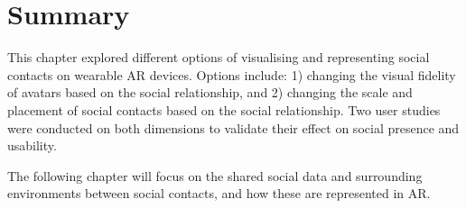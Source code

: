 \section{Summary}

This chapter explored different options of visualising and representing social contacts on wearable AR devices. Options include: 1) changing the visual fidelity of avatars based on the social relationship, and 2) changing the scale and placement of social contacts based on the social relationship. Two user studies were conducted on both dimensions to validate their effect on social presence and usability. 

The following chapter will focus on the shared social data and surrounding environments between social contacts, and how these are represented in AR. 